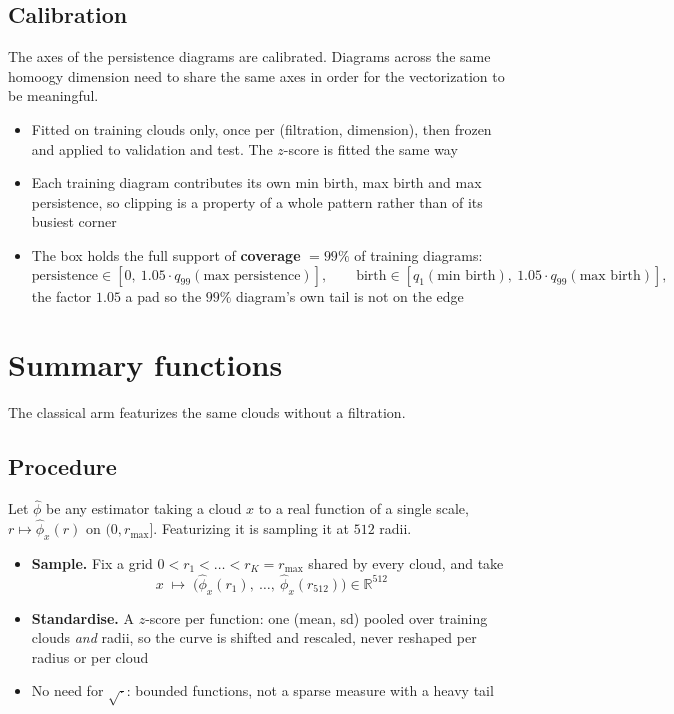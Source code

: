\documentclass[11pt]{article}
\newcommand{\R}{\mathbb R}
\begin{document}
\subsection*{Calibration}
The axes of the persistence diagrams are calibrated. Diagrams across the same homoogy dimension 
need to share the same axes in order for the vectorization to be meaningful.
\begin{itemize}
  \item Fitted on training clouds only, once per (filtration, dimension), then frozen and applied to validation and test. The $z$-score is fitted the same way
  \item Each training diagram contributes its own min birth, max birth and max persistence, so clipping is a property of a whole pattern rather than of its busiest corner
  \item The box holds the full support of \textbf{coverage} $=99\%$ of training diagrams: 
  \[
    \text{persistence} \in [0,\ 1.05\cdot q_{99}(\text{max persistence})],
    \qquad
    \text{birth} \in [q_{1}(\text{min birth}),\ 1.05\cdot q_{99}(\text{max birth})],
  \]
  the factor $1.05$ a pad so the $99\%$ diagram's own tail is not on the edge
\end{itemize}

\section{Summary functions}
The classical arm featurizes the same clouds without a filtration.

\subsection*{Procedure}
Let $\hat\phi$ be any estimator taking a cloud $x$ to a real function of a single scale,
$r\mapsto\hat\phi_x(r)$ on $(0,r_{\max}]$. Featurizing it is sampling it at $512$ radii.
\begin{itemize}
  \item \textbf{Sample.} Fix a grid $0<r_1<\dots<r_K=r_{\max}$ shared by every cloud, and take
  \[
    x \;\longmapsto\; \big(\hat\phi_x(r_1),\ \dots,\ \hat\phi_x(r_{512})\big)\in\R^{512}
  \]
  \item \textbf{Standardise.} A $z$-score per function: one (mean, sd) pooled over training clouds \emph{and} radii, so the curve is shifted and rescaled, never reshaped per radius or per cloud
  \item No need for $\sqrt{\cdot}$: bounded functions, not a sparse measure with a heavy tail
\end{itemize}
\end{document}
